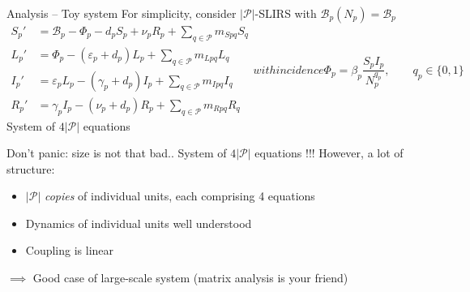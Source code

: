 \documentclass[aspectratio=169]{beamer}\usepackage[]{graphicx}\usepackage[]{xcolor}
\begin{document}
\begin{frame}{Analysis -- Toy system}
For simplicity, consider $|\mathcal{P}|$-SLIRS with $\mathcal{B}_p(N_p)=\mathcal{B}_p$
\begin{subequations}
	\label{sys:pSLIRS_toy}
	\begin{align}
		S_{p}' &=\mathcal{B}_p-\Phi_p-d_pS_p+\nu_pR_p
		+\textstyle{\sum_{q\in\mathcal{P}}} m_{Spq}S_{q} 
		\label{sys:pSLIRS_toy_dS} \\
		L_{p}' &=\Phi_p-\left( \varepsilon_{p}+d_{p}\right)L_{p}
		+\textstyle{\sum_{q\in\mathcal{P}}} m_{Lpq}L_{q} 
		\label{sys:pSLIRS_toy_dL} \\
		I_{p}' &=\varepsilon_pL_p-(\gamma_p+d_p)I_p
		+\textstyle{\sum_{q\in\mathcal{P}}} m_{Ipq}I_{q} 
		\label{sys:pSLIRS_toy_dI} \\
		R_{p}' &=\gamma _{p}I_{p}-\left(\nu_{p}+d_{p}\right)R_{p}
		+\textstyle{\sum_{q\in\mathcal{P}}} m_{Rpq}R_{q}
		\label{sys:pSLIRS_toy_dR} 
	\end{align}
	with incidence
	\begin{equation}
		\Phi_p=\beta_p\frac{S_pI_p}{N_p^{q_p}},\qquad q_p\in\{0,1\}
		\label{sys:pSLIRS_toy_incidence} 
	\end{equation}			
\end{subequations}
\vfill
System of $4|\mathcal{P}|$ equations
\end{frame}

\begin{frame}{Don't panic: size is not that bad..}
System of $4|\mathcal{P}|$ equations !!!
\vfill
However, a lot of structure: 
\begin{itemize}
	\item $|\mathcal{P}|$ \emph{copies} of individual units, each comprising 4 equations
	\item Dynamics of individual units well understood
	\item Coupling is linear
\end{itemize}
\vfill
$\implies$ Good case of large-scale system
\vfill
(matrix analysis is your friend)

\end{frame}



\end{document}
